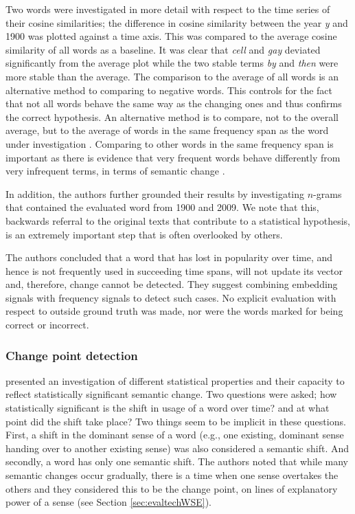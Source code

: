 \documentclass[output=paper]{langsci/langscibook}
\begin{document}
Two words were investigated in more detail with respect to the time series of their cosine similarities; the difference in cosine similarity between the year \textit{y} and 1900 was plotted against a time axis. This was compared to the average cosine similarity of all words as a baseline. It was clear that \emph{cell} and \emph{gay} deviated significantly from the average plot while the two stable terms \emph{by} and \emph{then} were more stable than the average. The comparison to the average of all words is an alternative method to comparing to negative words. This controls for the fact that not all words behave the same way as the changing ones and thus confirms the correct hypothesis. An alternative method  is to compare, not to the overall average, but to the average of words in the same frequency span as the word under investigation \citep[like in][]{jatowt2018every}. Comparing to other words in the same frequency span is important as there is evidence that very frequent words behave differently from very infrequent terms, in terms of semantic change \citep{hamilton-etal-2016-diachronic,pagel2007frequency,lieberman2007quantifying}. 

\begin{sloppypar}
In addition, the authors further grounded their results by investigating $n$-grams that contained the evaluated word from 1900 and 2009. We note that this, backwards referral to the original texts that contribute to a statistical hypothesis, is an extremely important step that is often overlooked by others. 
\end{sloppypar}
     
     The authors concluded that a word that has lost in popularity over time, and hence is not frequently used in succeeding time spans, will not update its vector and, therefore, change cannot be detected. They suggest combining embedding signals with frequency signals to detect such cases. 
      No explicit evaluation with respect to outside ground truth was made, nor were the words marked for being correct or incorrect. 
     
\subsubsection{Change point detection}\largerpage
\citet{kulkarni2015statistically} presented an investigation of different statistical properties and their capacity to reflect statistically significant semantic change. Two questions were asked; how statistically significant is the shift in usage of a word over time? and at what point did the shift take place? Two things seem to be implicit in these questions. First, a shift in the dominant sense of a word (e.g.,  one existing, dominant sense handing over to another existing sense) was also considered a semantic shift. And secondly, a word has only one semantic shift. The authors noted that while many semantic changes occur gradually, there is a time when one sense overtakes the others and they considered this to be the change point, on lines of explanatory power of a  sense (see Section \ref{sec:evaltechWSE}). 
\end{document}
